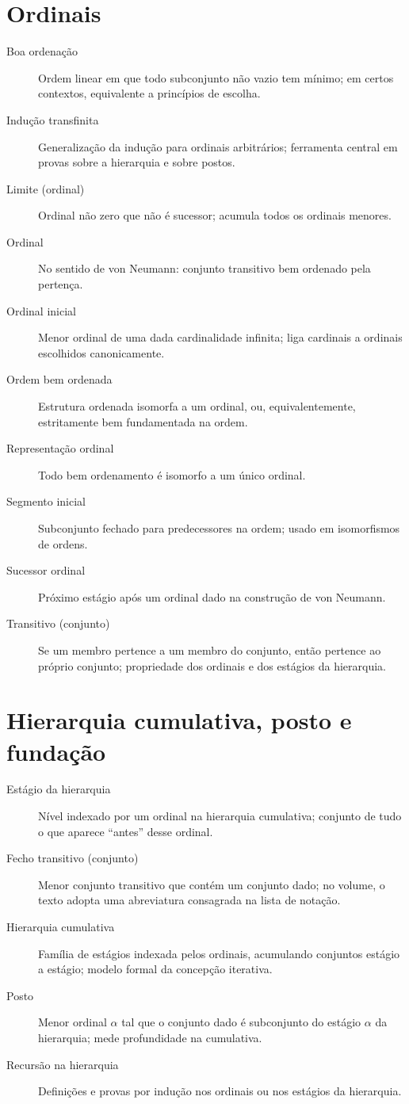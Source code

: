 \section*{Ordinais}

\begin{description}
\item[Boa ordenação] Ordem linear em que todo subconjunto não vazio tem mínimo; em certos contextos, equivalente a princípios de escolha.
\item[Indução transfinita] Generalização da indução para ordinais arbitrários; ferramenta central em provas sobre a hierarquia e sobre postos.
\item[Limite (ordinal)] Ordinal não zero que não é sucessor; acumula todos os ordinais menores.
\item[Ordinal] No sentido de von Neumann: conjunto transitivo bem ordenado pela pertença.
\item[Ordinal inicial] Menor ordinal de uma dada cardinalidade infinita; liga cardinais a ordinais escolhidos canonicamente.
\item[Ordem bem ordenada] Estrutura ordenada isomorfa a um ordinal, ou, equivalentemente, estritamente bem fundamentada na ordem.
\item[Representação ordinal] Todo bem ordenamento é isomorfo a um único ordinal.
\item[Segmento inicial] Subconjunto fechado para predecessores na ordem; usado em isomorfismos de ordens.
\item[Sucessor ordinal] Próximo estágio após um ordinal dado na construção de von Neumann.
\item[Transitivo (conjunto)] Se um membro pertence a um membro do conjunto, então pertence ao próprio conjunto; propriedade dos ordinais e dos estágios da hierarquia.
\end{description}

\section*{Hierarquia cumulativa, posto e fundação}

\begin{description}
\item[Estágio da hierarquia] Nível indexado por um ordinal na hierarquia cumulativa; conjunto de tudo o que aparece ``antes'' desse ordinal.
\item[Fecho transitivo (conjunto)] Menor conjunto transitivo que contém um conjunto dado; no volume, o texto adopta uma abreviatura consagrada na lista de notação.
\item[Hierarquia cumulativa] Família de estágios indexada pelos ordinais, acumulando conjuntos estágio a estágio; modelo formal da concepção iterativa.
\item[Posto] Menor ordinal $\alpha$ tal que o conjunto dado é subconjunto do estágio $\alpha$ da hierarquia; mede profundidade na cumulativa.
\item[Recursão na hierarquia] Definições e provas por indução nos ordinais ou nos estágios da hierarquia.
\end{description}

